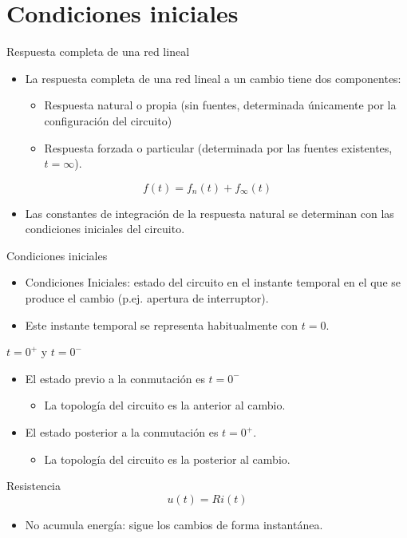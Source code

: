 \documentclass[aspectratio=169, usenames,svgnames,dvipsnames]{beamer}
\begin{document}
\section{Condiciones iniciales}
\label{sec:org047c190}
\begin{frame}[label={sec:org4317e9c}]{Respuesta completa de una red lineal}
\begin{itemize}
\item La respuesta completa de una red lineal a un cambio tiene dos componentes:
\begin{itemize}
\item Respuesta \alert{natural} o propia (sin fuentes, determinada únicamente por la configuración del circuito)
\item Respuesta \alert{forzada} o particular (determinada por las fuentes existentes, \(t = \infty\)).
\end{itemize}
\end{itemize}
\[
 \boxed{f(t) = f_n(t) + f_\infty(t) }
 \]
\begin{itemize}
\item Las constantes de integración de la respuesta natural se determinan con las condiciones iniciales del circuito.
\end{itemize}
\end{frame}

\begin{frame}[label={sec:org5552178}]{Condiciones iniciales}
\begin{itemize}
\item \alert{Condiciones Iniciales}: estado del circuito en el instante temporal en el que se produce el cambio (p.ej. apertura de interruptor).
\item Este instante temporal se representa habitualmente con \(t = 0\).
\end{itemize}
\end{frame}
\begin{frame}[label={sec:org4c166d3}]{\(t = 0^+\) y \(t = 0^-\)}
\begin{itemize}
\item El estado previo a la conmutación es \(t = 0^-\) 
\begin{itemize}
\item La topología del circuito es la anterior al cambio.
\end{itemize}
\item El estado posterior a la conmutación es \(t = 0^+\).
\begin{itemize}
\item La topología del circuito es la posterior al cambio.
\end{itemize}
\end{itemize}
\end{frame}
\begin{frame}[label={sec:orge3930cc}]{Resistencia}
\[
u(t) = R i(t)
\]

\begin{itemize}
\item No acumula energía: sigue los cambios de forma instantánea.
\end{itemize}
\end{frame}
\end{document}

